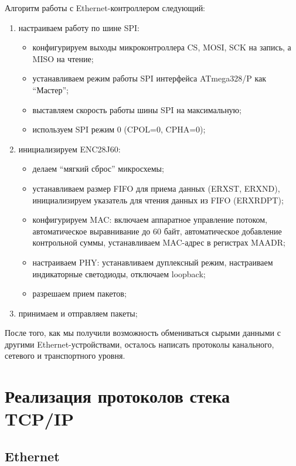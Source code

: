 {\small{}}

Алгоритм работы с Ethernet-контроллером следующий:
\begin{enumerate}
	\item настраиваем работу по шине SPI: 
		\begin{itemize}
			\item конфигурируем выходы микроконтроллера CS, MOSI, SCK на запись, а MISO на чтение;
			\item устанавливаем режим работы SPI интерфейса ATmega328/P как ``Мастер'';
			\item выставляем скорость работы шины SPI на максимальную;
			\item используем SPI режим 0 (CPOL=0, CPHA=0);
		\end{itemize}
	\item инициализируем ENC28J60:
		\begin{itemize}
			\item делаем ``мягкий сброс'' микросхемы;
			\item устанавливаем размер FIFO для приема данных (ERXST, ERXND), инициализируем указатель для чтения данных из FIFO (ERXRDPT);
			\item конфигурируем MAC: включаем аппаратное управление потоком, автоматическое выравнивание до 60 байт, автоматическое добавление контрольной суммы, устанавливаем MAC-адрес в регистрах MAADR;
			\item настраиваем PHY: устанавливаем дуплексный режим, настраиваем индикаторные светодиоды, отключаем loopback;
			\item разрешаем прием пакетов;
		\end{itemize}
	\item принимаем и отправляем пакеты;
\end{enumerate}

После того, как мы получили возможность обмениваться сырыми данными с другими Ethernet-устройствами, осталось написать протоколы канального, сетевого и транспортного уровня.

\section{Реализация протоколов стека TCP/IP}

\subsection{Ethernet}

